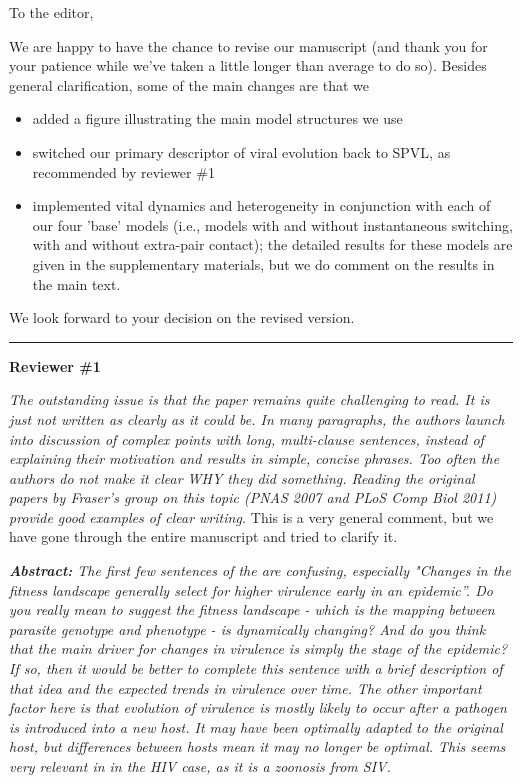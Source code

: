 \documentclass[10pt]{letter}
\newcommand{\revcomment}[1]{\emph{#1}}
\newcommand{\response}[1]{#1}
\begin{document}
\date{\today}

\signature{\texttt{[image: bbsig3.png]}\\Benjamin Bolker}

\begin{letter}{
} 

\opening{To the editor,}

We are happy to have the chance to revise our manuscript
(and thank you for your patience while we've taken a little
longer than average to do so). Besides general clarification,
some of the main changes are that we
\begin{itemize}
  \item added a figure illustrating the main model structures we use
  \item switched our primary descriptor of viral evolution back to SPVL, as recommended by reviewer \#1
  \item implemented vital dynamics and heterogeneity in conjunction
with each of our four 'base' models (i.e., models with and 
without instantaneous switching, with and without extra-pair contact); 
the detailed results for these models are given in the supplementary materials, but
we do comment on the results in the main text.
\end{itemize}

We look forward to your decision on the revised version.

\vskip10pt
\hrule

\textbf{Reviewer \#1}

\revcomment{
The outstanding issue is that the paper remains quite challenging to
read. It is just not written as clearly as it could be. In many
paragraphs, the authors launch into discussion of complex points with
long, multi-clause sentences, instead of explaining their motivation
and results in simple, concise phrases. Too often the authors do not
make it clear WHY they did something. Reading the original papers by
Fraser’s group on this topic (PNAS 2007 and PLoS Comp Biol 2011)
provide good examples of clear writing.
}
\response{This is a very general comment, but we have gone
through the entire manuscript and tried to clarify it.}

\revcomment{
\textbf{Abstract:} The first few sentences of the are confusing,
especially "Changes in the fitness landscape generally select for
higher virulence early in an epidemic”. Do you really mean to suggest
the fitness landscape - which is the mapping between parasite genotype
and phenotype - is dynamically changing? And do you think that the
main driver for changes in virulence is simply the stage of the
epidemic? If so, then it would be better to complete this sentence
with a brief description of that idea and the expected trends in
virulence over time. The other important factor here is that evolution
of virulence is mostly likely to occur after a pathogen is introduced
into a new host. It may have been optimally adapted to the original
host, but differences between hosts mean it may no longer be
optimal. This seems very relevant in in the HIV case, as it is a
zoonosis from SIV.
}


\end{letter}
\end{document}
